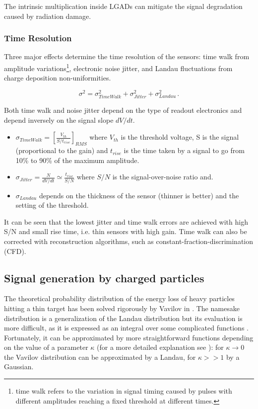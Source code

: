 The intrinsic multiplication inside LGADs can mitigate the signal degradation caused by radiation damage.

\subsubsection{Time Resolution}

Three major effects determine the time resolution of the sensors: time walk from amplitude variations\footnote{time walk refers to the variation in signal timing caused by pulses with different amplitudes reaching a fixed threshold at different times.}, electronic noise jitter, and Landau fluctuations from charge deposition non-uniformities.

\begin{equation}\label{eq:time_resoltuion_LGADs}
    \sigma^2 = \sigma_{TimeWalk}^2 + \sigma_{Jitter}^2 + \sigma_{Landau}^2  \, .
\end{equation}

 Both time walk and noise jitter depend on the type of readout electronics and depend inversely on the signal slope $dV/dt$.

\begin{itemize}
    \item $\sigma_{TimeWalk} = \left[ \frac{V_{th}}{S/t_{rise}}\right]_{RMS}$ where $V_{th}$ is the threshold voltage, S is the signal (proportional to the gain) and $t_{rise}$ is the time taken by a signal to go from 10\% to 90\% of the maximum amplitude.
    \item $\sigma_{Jitter} = \frac{N}{dV/dt} \simeq \frac{t_{rise}}{S/N}$ where $S/N$ is the signal-over-noise ratio and.
    \item $\sigma_{Landau}$ depends on the thickness of the sensor (thinner is better) and the setting of the threshold.
\end{itemize}

It can be seen that the lowest jitter and time walk errors are achieved with high S/N and small rise time, i.e. thin sensors with high gain. Time walk can also be corrected with reconstruction algorithms, such as constant-fraction-discrimination (CFD).

\subsection{Signal generation by charged particles}

The theoretical probability distribution of the energy loss of heavy particles hitting a thin target has been solved rigorously by Vavilov in \cite{vavilov_1957}. The namesake distribution is a generalization of the Landau distribution but its evaluation is more difficult, as it is expressed as an integral over some complicated functions \cite[Eq.(4)]{vavilov_1957}. Fortunately, it can be approximated by more straightforward functions depending on the value of a parameter $\kappa$ (for a more detailed explanation see ): for $\kappa\rightarrow0$ the Vavilov distribution can be approximated by a Landau, for $\kappa>>1$ by a Gaussian.


